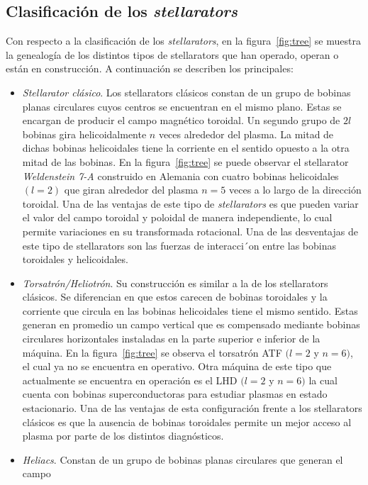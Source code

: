 \subsection{Clasificación de los \textit{stellarators}}
Con respecto a la clasificación de los \textit{stellarators}, en la figura~\ref{fig:tree} se muestra la genealogía
de los distintos tipos de stellarators que han operado, operan o están en construcción. A
continuación se describen los principales:
\begin{itemize}
    \item \textit{Stellarator clásico}. Los stellarators clásicos constan de un grupo de bobinas planas circulares
    cuyos centros se encuentran en el mismo plano. Estas se encargan de producir
    el campo magnético toroidal. Un segundo grupo de $2l$ bobinas gira helicoidalmente $n$
    veces alrededor del plasma. La mitad de dichas bobinas helicoidales tiene la corriente
    en el sentido opuesto a la otra mitad de las bobinas. En la figura~\ref{fig:tree} se puede observar
    el stellarator \textit{Weldenstein 7-A} construido en Alemania con cuatro bobinas helicoidales
    $(l=2)$ que giran alrededor del plasma $n=5$ veces a lo largo de la dirección toroidal.
    Una de las ventajas de este tipo de \textit{stellarators} es que pueden variar el valor del campo
    toroidal y poloidal de manera independiente, lo cual permite variaciones en su transformada
    rotacional.
    Una de las desventajas de este tipo de stellarators son las fuerzas de interacci´on entre
    las bobinas toroidales y helicoidales.
    \item \textit{Torsatrón/Heliotrón}. Su construcción es similar a la de los stellarators clásicos. Se
    diferencian en que estos carecen de bobinas toroidales y la corriente que circula en
    las bobinas helicoidales tiene el mismo sentido. Estas generan en promedio un campo
    vertical que es compensado mediante bobinas circulares horizontales instaladas en la
    parte superior e inferior de la máquina. En la figura~\ref{fig:tree} se observa el torsatrón ATF
   $(l=2$ y $n=6)$, el cual ya no se encuentra en operativo. Otra máquina de este tipo
    que actualmente se encuentra en operación es el LHD $(l=2$ y $n=6)$ la cual cuenta con
    bobinas superconductoras para estudiar plasmas en estado estacionario.
    Una de las ventajas de esta configuración frente a los stellarators clásicos es que la
    ausencia de bobinas toroidales permite un mejor acceso al plasma por parte de los
    distintos diagnósticos.
    \item \textit{Heliacs}. Constan de un grupo de bobinas planas circulares que generan el campo

\end{itemize}
